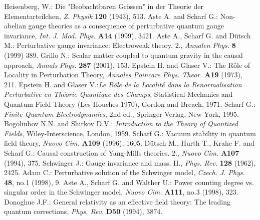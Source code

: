 \documentclass[a4paper,11pt]{article}
\begin{document}
\begin{thebibliography}{99}
Heisenberg, W.: Die "Beobachtbaren Gr\"ossen"
in der Theorie der Elementarteilchen,
{\em{Z. Physik}} {\bf{120}} (1943), 513.
Aste A. and Scharf G.: Non-abelian gauge theories as a consequence of
perturbative quantum gauge invariance, {\em{Int. J. Mod. Phys.}} {\bf{A14}}
(1999), 3421.
Aste A., Scharf G. and D\"utsch M.: Perturbative gauge invariance:
Electroweak theory. 2., {\em{Annalen Phys.}} {\bf{8}} (1999) 389.
Grillo N.: Scalar matter coupled to quantum gravity in the causal approach,
{\em{Annals Phys.}} {\bf{287}} (2001), 153.
Epstein H. and Glaser V.: The R\^{o}le of Locality in Perturbation Theory,
{\em{Annales Poincare Phys. Theor.}} {\bf{A19}} (1973), 211.
Epstein H. and Glaser V.:{\em{Le R\^{o}le de la Localit\'{e}
dans la Renormalisation Perturbative en Th\'{e}orie Quantique des Champs}},
Statistical Mechanics and Quantum Field Theory (Les Houches 1970),
Gordon and Breach, 1971.
Scharf G.: {\em Finite Quantum Electrodynamics}, 2nd ed., Springer Verlag,
New York, 1995.
Bogoliubov N.N. and Shirkov D.V.: {\em{Introduction to the Theory of
Quantized Fields}}, Wiley-Interscience, London, 1959.
Scharf G.: Vacuum stability in quantum field theory,
{\em Nuovo Cim.} {\bf A109} (1996), 1605.
D\"utsch M., Hurth T., Krahe F. and Scharf G.: Causal
construction of Yang-Mills theories. 2., {\em{Nuovo Cim.}} {\bf{A107}} (1994),
375. 
Schwinger J.: Gauge invariance and mass. II.,
{\em{Phys. Rev.}} {\bf{128}} (1962), 2425.
Adam C.: Perturbative solution of the Schwinger model,
{\em{Czech. J. Phys.}} {\bf{48}}, no.1 (1998), 9.
Aste A., Scharf G. and Walther U.: Power counting degree vs. singular order
in the Schwinger model,
{\em{Nuovo Cim.}} {\bf{A111}}, no.3 (1998), 323.
Donoghue J.F.: General relativity as an effective field theory: The
leading quantum corrections, {\em{Phys. Rev.}} {\bf{D50}} (1994), 3874.
\end{thebibliography}
\end{document}
